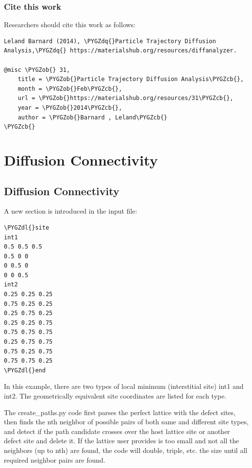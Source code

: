 \documentclass[letterpaper,10pt,english]{sphinxmanual}
\def\PYGZob{\char`\{}
\def\PYGZcb{\char`\}}
\def\PYGZdl{\char`\$}
\def\PYGZdq{\char`\"}
\begin{document}
\subsubsection{Cite this work}
\label{8_0_3_diffanalyzer:cite-this-work}
Researchers should cite this work as follows:

\begin{Verbatim}[commandchars=\\\{\}]
Leland Barnard (2014), \PYGZdq{}Particle Trajectory Diffusion Analysis,\PYGZdq{} https://materialshub.org/resources/diffanalyzer.

@misc \PYGZob{} 31,
    title = \PYGZob{}Particle Trajectory Diffusion Analysis\PYGZcb{},
    month = \PYGZob{}Feb\PYGZcb{},
    url = \PYGZob{}https://materialshub.org/resources/31\PYGZcb{},
    year = \PYGZob{}2014\PYGZcb{},
    author = \PYGZob{}Barnard , Leland\PYGZcb{}
\PYGZcb{}
\end{Verbatim}


\section{Diffusion Connectivity}
\label{8_0_standalonetools:diffusion-connectivity}

\subsection{Diffusion Connectivity}
\label{8_0_1_diffusionconnectivity::doc}\label{8_0_1_diffusionconnectivity:diffusionconnectivity}\label{8_0_1_diffusionconnectivity:diffusion-connectivity}
A new section is introduced in the input file:

\begin{Verbatim}[commandchars=\\\{\}]
\PYGZdl{}site
int1
0.5 0.5 0.5
0.5 0 0
0 0.5 0
0 0 0.5
int2
0.25 0.25 0.25
0.75 0.25 0.25
0.25 0.75 0.25
0.25 0.25 0.75
0.75 0.75 0.75
0.25 0.75 0.75
0.75 0.25 0.75
0.75 0.75 0.25
\PYGZdl{}end
\end{Verbatim}

In this example, there are two types of local minimum (interstitial site) int1 and int2. The geometrically equivalent site coordinates are listed for each type.

The create\_paths.py code first parses the perfect lattice with the defect sites, then finds the nth neighbor of possible pairs of both same and different site types, and detect if the path candidate crosses over the host lattice site or another defect site and delete it.
If the lattice user provides is too small and not all the neighbors (up to nth) are found, the code will double, triple, etc. the size until all required neighbor pairs are found.
\end{document}
